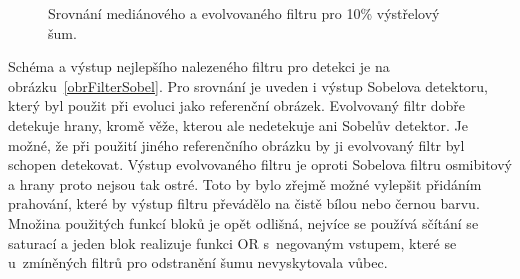 \begin{figure}[htb]
    \centering
    \hfill
    \hfill
    \caption{Srovnání mediánového a evolvovaného filtru pro 10\% výstřelový šum.}
    \label{obrFilterImp}
\end{figure}

Schéma a výstup nejlepšího nalezeného filtru pro detekci je na obrázku~\ref{obrFilterSobel}. Pro srovnání je uveden i výstup Sobelova detektoru, který byl použit při evoluci jako referenční obrázek. Evolvovaný filtr dobře detekuje hrany, kromě věže, kterou ale nedetekuje ani Sobelův detektor. Je možné, že při použití jiného referenčního obrázku by ji evolvovaný filtr byl schopen detekovat. Výstup evolvovaného filtru je oproti Sobelova filtru osmibitový a hrany proto nejsou tak ostré. Toto by bylo zřejmě možné vylepšit přidáním prahování, které by výstup filtru převádělo na čistě bílou nebo černou barvu. Množina použitých funkcí bloků je opět odlišná, nejvíce se používá sčítání se saturací a jeden blok realizuje funkci OR s~negovaným vstupem, které se u~zmíněných filtrů pro odstranění šumu nevyskytovala vůbec.


